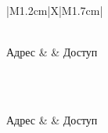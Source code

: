 \begin{tabularx}{\linewidth}{|M{1.2cm}|X|M{1.7cm}|}	
	\caption{Таблица битовых флагов Словаря объектов приемопередатчика} \label{tab:map_flags} \\
	
	\hline
	Адрес	& 	& Доступ	\\ \hline
	\endfirsthead
	
	 \\
	\endfoot
	\endlastfoot
	
	 	\\ \hline 
	Адрес	& 	& Доступ	\\ \hline
	\endhead
	

\end{tabularx}

